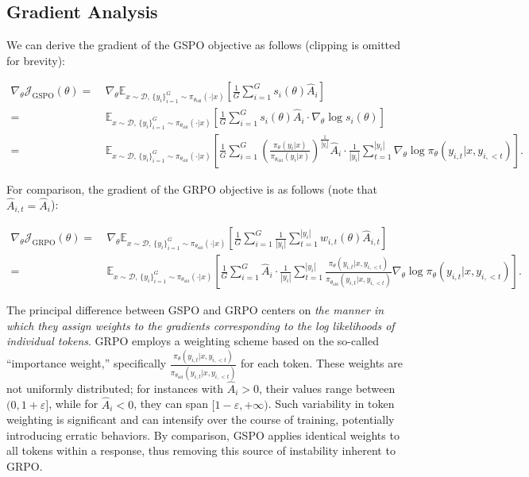 \subsection{Gradient Analysis}
\label{subsec:gradient}

We can derive the gradient of the GSPO objective as follows (clipping is omitted for brevity):

\begin{align}
\nabla_{\theta} \mathcal{J}_\text{GSPO} (\theta)
=&\ 
\nabla_{\theta} \mathbb{E}_{ x \sim \mathcal{D},\, \{y_i\}_{i=1}^G \sim \pi_{\theta_\text{old}}( \cdot | x) }
\left[ 
\frac{1}{G} \sum_{i=1}^{G} s_{i}(\theta) \widehat{A}_{i}
\right] \\
= &\ 
\mathbb{E}_{ x \sim \mathcal{D},\, \{y_i\}_{i=1}^G \sim \pi_{\theta_\text{old}}( \cdot | x) }
\left[ 
\frac{1}{G} \sum_{i=1}^{G}
s_{i}(\theta) \widehat{A}_{i}
\cdot \nabla_{\theta} \log s_{i}(\theta)
\right] \\
=&\ 
\mathbb{E}_{ x \sim \mathcal{D},\, \{y_i\}_{i=1}^G \sim \pi_{\theta_\text{old}}( \cdot | x) }
\left[ 
\frac{1}{G} \sum_{i=1}^{G} 
\left( \frac{ \pi_{\theta} (y_i | x) }{ \pi_{\theta_\text{old}} (y_i | x)} \right)^{\frac{1}{|y_i|}} \widehat{A}_{i} 
\cdot \frac{1}{|y_i|} \sum_{t=1}^{|y_i|} \nabla_{\theta} \log \pi_{\theta} (y_{i,t} | x, y_{i,<t}) 
\right].
\label{equ:gspo_grad}
\end{align}

For comparison, the gradient of the GRPO objective is as follows (note that $\widehat{A}_{i,t} = \widehat{A}_{i}$):

\begin{align}
\nabla_{\theta} \mathcal{J}_\text{GRPO} (\theta) 
=&\ 
\nabla_{\theta} \mathbb{E}_{ x \sim \mathcal{D},\, \{y_i\}_{i=1}^G \sim \pi_{\theta_\text{old}}( \cdot | x) }
\left[ \frac{1}{G} \sum_{i=1}^{G} \frac{1}{|y_i|} \sum_{t=1}^{|y_i|} 
w_{i,t}(\theta) \widehat{A}_{i,t}
\right] \\
=&\
\mathbb{E}_{ x \sim \mathcal{D},\, \{y_i\}_{i=1}^G \sim \pi_{\theta_\text{old}}( \cdot | x) }
\left[ \frac{1}{G} \sum_{i=1}^{G} \widehat{A}_{i} 
\cdot \frac{1}{|y_i|} \sum_{t=1}^{|y_i|} 
\frac{ \pi_{\theta} (y_{i,t} | x, y_{i,<t}) }{ \pi_{\theta_\text{old}} (y_{i,t} | x,y_{i,<t})} 
\nabla_{\theta} \log \pi_{\theta} (y_{i,t} | x, y_{i,<t})  
\right].
\end{align}

The principal difference between GSPO and GRPO centers on \textit{the manner in which they assign weights to the gradients corresponding to the log likelihoods of individual tokens}. GRPO employs a weighting scheme based on the so-called “importance weight,” specifically $\frac{ \pi_{\theta} (y_{i,t} | x, y_{i,<t}) }{ \pi_{\theta_\text{old}} (y_{i,t} | x,y_{i,<t})}$ for each token. These weights are not uniformly distributed; for instances with $\widehat{A}_{i} > 0$, their values range between $(0, 1+\varepsilon]$, while for $\widehat{A}_{i} < 0$, they can span $[1-\varepsilon, +\infty)$. Such variability in token weighting is significant and can intensify over the course of training, potentially introducing erratic behaviors. By comparison, GSPO applies identical weights to all tokens within a response, thus removing this source of instability inherent to GRPO.

